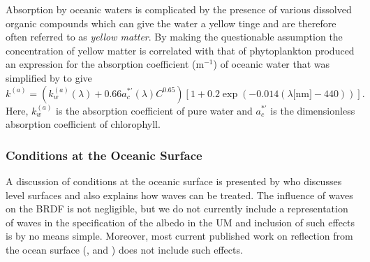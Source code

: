 Absorption by oceanic waters is complicated by the presence of various
dissolved organic compounds which can give the water a yellow tinge and
are therefore often referred to as  {\em yellow matter}. By making the
questionable assumption the concentration of yellow matter is correlated
with that of phytoplankton \cite{Prieur81} produced an expression for the
absorption coefficient (m${}^{-1}$) of oceanic water that was simplified by
\cite{Morel91} to give
\begin{equation}
k^{(a)} = \left ( k_w^{(a)}(\lambda) +0.66 a_c^{*'} (\lambda) C^{0.65}
\right ) \left [ 1 + 0.2 \exp (-0.014 (\lambda\mbox{[nm]}-440 )) \right ].
\end{equation}
Here, $k_w^{(a)}$ is the absorption coefficient of pure water and $a_c^{*'}$
is the dimensionless absorption coefficient of chlorophyll.

\subsubsection{Conditions at the Oceanic Surface}

A discussion of conditions at the oceanic surface is presented by \cite{Mobley94}
who discusses level surfaces and also explains how waves can be treated. The
influence of waves on the BRDF is not negligible, but we do not currently
include a representation of waves in the specification of the albedo in the
UM and inclusion of such effects is by no means simple. Moreover, most
current published work on reflection from the ocean surface (\cite{Morel93},
\cite{Morel95} and \cite{Yang97}) does not include such effects.

